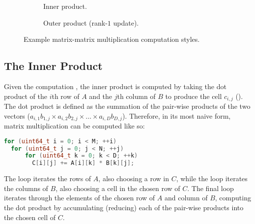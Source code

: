\documentclass[\main/thesis.tex]{subfiles}
\begin{document}
\begin{figure}[t]
 \hfill
  \begin{subfigure}{.45\linewidth}
    \centering
    \caption{Inner product.}
    \label{fig:innerProduct}
  \end{subfigure}
 \hfill
  \begin{subfigure}{.45\linewidth}
    \centering
  \caption{Outer product (rank-$1$ update).}
    \label{fig:outerProduct}
  \end{subfigure}
  \hfill
  \caption{Example matrix-matrix multiplication computation styles.}
  \label{fig:product}
  \vspace{-0.15cm}
\end{figure}

\subsection{The Inner Product}
Given the computation , the inner product is computed by taking the dot product of the $i$th row of $A$ and the $j$th column of $B$ to produce the cell $c_{i,j}$ ().
The dot product is defined as the summation of the pair-wise products of the two vectors (\eg $a_{i,1}b_{1,j} \times a_{i,2}b_{2,j} \times \ldots \times a_{i,D}b_{D,j}$).
Therefore, in its most naive form, matrix multiplication can be computed like so:
\begin{lstlisting}[caption={[Basic inner product]A basic matrix multiplication via inner product.},label=lst:basicInner,language=C++,columns=flexible,morekeywords=uint64_t]
for (uint64_t i = 0; i < M; ++i)
  for (uint64_t j = 0; j < N; ++j)
      for (uint64_t k = 0; k < D; ++k)
        C[i][j] += A[i][k] * B[k][j];
\end{lstlisting}
The  loop iterates the rows of $A$, also choosing a row in $C$, while the  loop iterates the columns of $B$, also choosing a cell in the chosen row of $C$.
The final  loop iterates through the elements of the chosen row of $A$ and column of $B$, computing the dot product by accumulating (reducing) each of the pair-wise products into the chosen cell of $C$.
\end{document}
